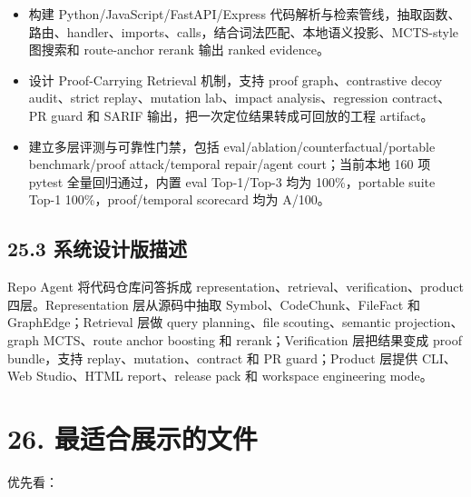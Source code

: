 \documentclass[UTF8,12pt,openany]{ctexbook}
\begin{document}
\begin{itemize}
\item 构建 Python/JavaScript/FastAPI/Express 代码解析与检索管线，抽取函数、路由、handler、imports、calls，结合词法匹配、本地语义投影、MCTS-style 图搜索和 route-anchor rerank 输出 ranked evidence。
\item 设计 Proof-Carrying Retrieval 机制，支持 proof graph、contrastive decoy audit、strict replay、mutation lab、impact analysis、regression contract、PR guard 和 SARIF 输出，把一次定位结果转成可回放的工程 artifact。
\item 建立多层评测与可靠性门禁，包括 eval/ablation/counterfactual/portable benchmark/proof attack/temporal repair/agent court；当前本地 160 项 pytest 全量回归通过，内置 eval Top-1/Top-3 均为 100\%，portable suite Top-1 100\%，proof/temporal scorecard 均为 A/100。
\end{itemize}

\subsection{25.3 系统设计版描述}

Repo Agent 将代码仓库问答拆成 representation、retrieval、verification、product 四层。Representation 层从源码中抽取 Symbol、CodeChunk、FileFact 和 GraphEdge；Retrieval 层做 query planning、file scouting、semantic projection、graph MCTS、route anchor boosting 和 rerank；Verification 层把结果变成 proof bundle，支持 replay、mutation、contract 和 PR guard；Product 层提供 CLI、Web Studio、HTML report、release pack 和 workspace engineering mode。\par

\section{26. 最适合展示的文件}

优先看：\par
\end{document}
